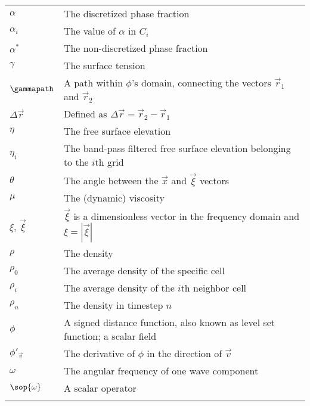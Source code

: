 {\begin{center}
\begin{longtabu}{l X}
    $\alpha$            & The discretized phase fraction \\
    $\alpha_i$          & The value of $\alpha$ in $C_i$ \\
    $\alpha^*$          & The non-discretized phase fraction \\
    $\gamma$            & The surface tension \\
    $\gammapath$        & A path within $\phi$'s domain, connecting the vectors
                          $\vec{r}_1$ and $\vec{r}_2$ \\
    $\Delta\vec{r}$     & Defined as $\Delta\vec{r} = \vec{r}_2 - \vec{r}_1$ \\
    $\eta$              & The free surface elevation \\
    $\eta_i$            & The band-pass filtered free surface elevation belonging to the $i$th grid \\
    $\theta$            & The angle between the $\vec{x}$ and $\vec{\xi}$ vectors \\
    $\mu$               & The (dynamic) viscosity \\
    $\xi,\,\vec{\xi}$   & $\vec{\xi}$ is a dimensionless vector in the frequency domain
                          and $\xi = |\vec{\xi}|$ \\
    $\rho$              & The density \\
    $\rho_0$            & The average density of the specific cell \\
    $\rho_i$            & The average density of the $i$th neighbor cell \\
    $\rho_n$            & The density in timestep $n$ \\
    $\phi$              & A signed distance function, also known as level set function;
                          a scalar field \\
    $\phi'_{\vec{v}}$   & The derivative of $\phi$ in the direction of $\vec{v}$ \\
    $\omega$            & The angular frequency of one wave component \\
    $\sop{\omega}$      & A scalar operator \\
    
    \\
    

\end{longtabu}
\end{center}}
